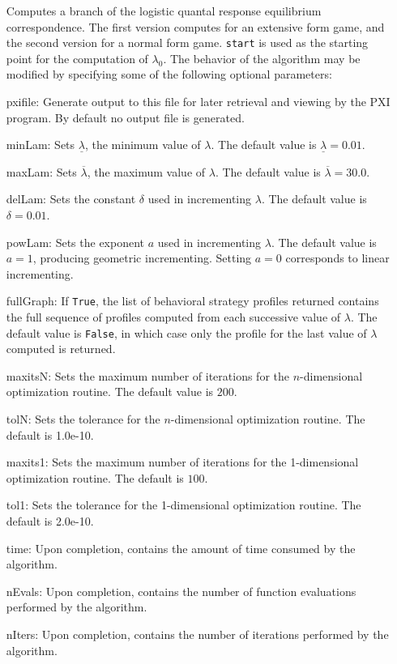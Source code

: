 \begin{itemize}
\bd 
Computes a branch of the logistic quantal response equilibrium
correspondence.  The first version computes for an extensive form
game, and the second version for a normal form game.  \verb+start+ is
used as the starting point for the computation of $\lambda_{0}$.  The
behavior of the algorithm may be modified by specifying some of the
following optional parameters:
\bd
\item
[pxifile:] Generate output to this file for later retrieval and viewing by
the PXI program.  By default no output file is generated.
\item
[minLam:] Sets $\underline{\lambda}$, the minimum value of $\lambda$.  The 
default value is $\underline{\lambda}=0.01$.
\item
[maxLam:] Sets $\overline{\lambda}$, the maximum value of $\lambda$.  The
default value is $\overline{\lambda}=30.0$.
\item
[delLam:] Sets the constant $\delta$ used in incrementing $\lambda$.  The
default value is $\delta=0.01$.
\item
[powLam:] Sets the exponent $a$ used in incrementing $\lambda$.  The default
value is $a=1$, producing geometric incrementing.  Setting $a=0$ corresponds
to linear incrementing.
\item
[fullGraph:] If \verb+True+, the list of behavioral strategy profiles
returned contains the full sequence of profiles computed from each successive
value of $\lambda$.  The default value is \verb+False+, in which case only
the profile for the last value of $\lambda$ computed is returned.
\item
[maxitsN:] Sets the maximum number of iterations for the $n$-dimensional
optimization routine.  The default value is $200$.
\item
[tolN:] Sets the tolerance for the $n$-dimensional optimization routine.
The default is 1.0e-10.
\item
[maxits1:] Sets the maximum number of iterations for the 1-dimensional
optimization routine.  The default is $100$.
\item
[tol1:] Sets the tolerance for the 1-dimensional optimization routine.
The default is 2.0e-10.
\item
[time:] Upon completion, contains the amount of time consumed by the
algorithm.
\item
[nEvals:] Upon completion, contains the number of function evaluations
performed by the algorithm.
\item
[nIters:] Upon completion, contains the number of iterations performed
by the algorithm.
\ed


\end{itemize}
